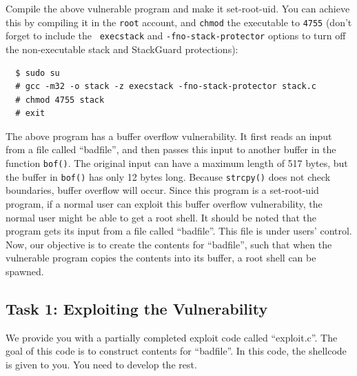 Compile the above vulnerable program and make it set-root-uid. You
can achieve this by compiling it in the {\tt root} account, and 
{\tt chmod} the executable to {\tt 4755} (don't forget to include the {\tt
execstack} and {\tt -fno-stack-protector} options to turn off
the non-executable stack and StackGuard protections):

\begin{verbatim}
  $ sudo su
  # gcc -m32 -o stack -z execstack -fno-stack-protector stack.c
  # chmod 4755 stack
  # exit  
\end{verbatim}



The above program has a buffer overflow vulnerability. It first 
reads an input from a file called ``badfile'', and then passes this
input to another buffer in the function {\tt bof()}. The 
original input can have a maximum length of 517 bytes, but the buffer
in {\tt bof()} has only 12 bytes long. Because {\tt strcpy()} does not check
boundaries, buffer overflow will occur.
Since this program is a set-root-uid program, if a normal user can exploit
this buffer overflow vulnerability, the normal user might be 
able to get a root shell.
It should be noted that 
the program gets its input from a file called ``badfile''. This file
is under users' control. Now, our objective is to 
create the contents for ``badfile'', such that when the vulnerable program
copies the contents into its buffer, a root shell can be spawned.



\subsection{Task 1: Exploiting the Vulnerability} 

We provide you with a partially completed exploit code called 
``exploit.c''. The goal of this code is to construct contents 
for ``badfile''. In this code, the shellcode is given to you. 
You need to develop the rest. 


